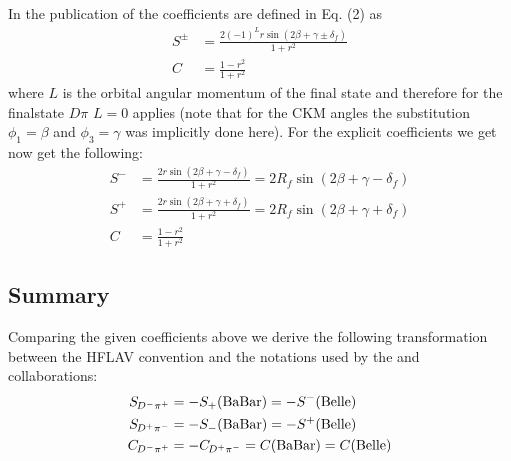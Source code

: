 \subsection{\belle}

In the publication of \belle \cite{Ronga:2006hv} the \CP coefficients are defined in Eq. (2) as
\begin{align}
S^{\pm}&=\frac{2\left(-1\right)^{L}r\sin\!\left(2\beta+\gamma\pm\delta_f\right)}{1+r^2}\\
C&=\frac{1-r^2}{1+r^2}
\end{align}
where $L$ is the orbital angular momentum of the final state and therefore for the finalstate $D\pi$ $L=0$ applies (note that for
the CKM angles the substitution $\phi_1=\beta$ and $\phi_3=\gamma$  was implicitly done here). For the explicit \CP coefficients
we get now get the following:
\begin{align}
S^{-}&=\frac{2r\sin\!\left(2\beta+\gamma-\delta_f\right)}{1+r^2} = 2R_f\sin\!\left(2\beta+\gamma-\delta_f\right)\\
S^{+}&=\frac{2r\sin\!\left(2\beta+\gamma+\delta_f\right)}{1+r^2} = 2R_f\sin\!\left(2\beta+\gamma+\delta_f\right)\\
C&=\frac{1-r^2}{1+r^2}
\end{align}

\subsection{Summary}

Comparing the given \CP coefficients above we derive the following transformation between the HFLAV convention and the
notations used by the \babar and \belle collaborations:
\begin{align}
\mbox{\ensuremath{S_{\kern -0.8pt D^{-}\pi^{+}}}} &= -S_{+}(\text{BaBar}) = -S^{-}(\text{Belle})\\
\mbox{\ensuremath{S_{\kern -0.8pt D^{+}\pi^{-}}}} &= -S_{-}(\text{BaBar}) = -S^{+}(\text{Belle})\\
\mbox{\ensuremath{C_{\kern -0.8pt D^{-}\pi^{+}}}} &= -\mbox{\ensuremath{C_{\kern -0.8pt D^{+}\pi^{-}}}} = C(\text{BaBar}) = C(\text{Belle})
\end{align}

